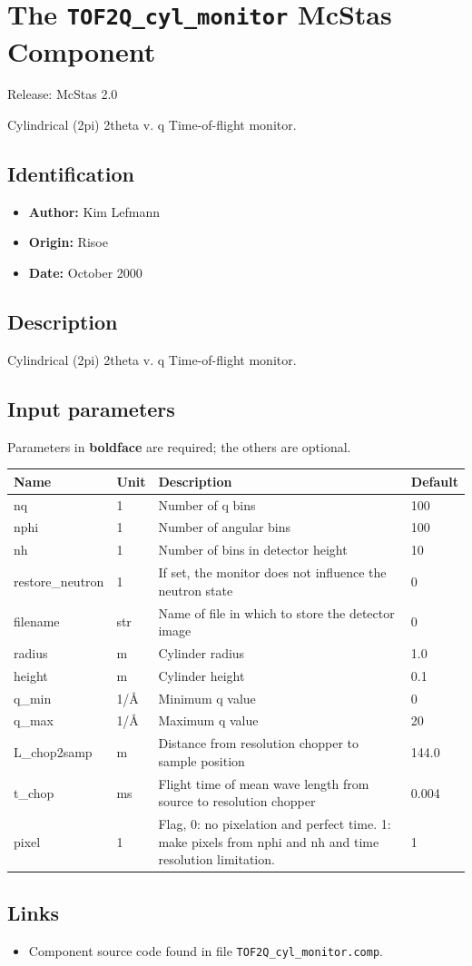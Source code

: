 \section{The \texttt{TOF2Q\_cyl\_monitor} McStas Component}
Release: McStas 2.0

Cylindrical (2pi) 2theta v. q Time-of-flight monitor.

\subsection*{Identification}
\begin{itemize}
  \item \textbf{Author:} Kim Lefmann
  \item \textbf{Origin:} Risoe
  \item \textbf{Date:} October 2000
\end{itemize}

\subsection*{Description}
Cylindrical (2pi) 2theta v. q Time-of-flight monitor.

\subsection*{Input parameters}
Parameters in \textbf{boldface} are required; the others are optional.

\begin{longtable}{p{}p{}p{}p{}}
\toprule
\textbf{Name} & \textbf{Unit} & \textbf{Description} & \textbf{Default} \\
\midrule
\endhead
nq & 1 & Number of q bins & 100 \\
nphi & 1 & Number of angular bins & 100 \\
nh & 1 & Number of bins in detector height & 10 \\
restore\_neutron & 1 & If set, the monitor does not influence the neutron state & 0 \\
filename & str & Name of file in which to store the detector image & 0 \\
radius & m & Cylinder radius & 1.0 \\
height & m & Cylinder height & 0.1 \\
q\_min & 1/\AA{} & Minimum q value & 0 \\
q\_max & 1/\AA{} & Maximum q value & 20 \\
L\_chop2samp & m & Distance from resolution chopper to sample position & 144.0 \\
t\_chop & ms & Flight time of mean wave length from source to resolution chopper & 0.004 \\
pixel & 1 & Flag, 0: no pixelation and perfect time. 1: make pixels from nphi and nh and time resolution limitation. & 1 \\
\bottomrule
\end{longtable}

\subsection*{Links}
\begin{itemize}
  \item Component source code found in file \texttt{TOF2Q\_cyl\_monitor.comp}.
\end{itemize}
